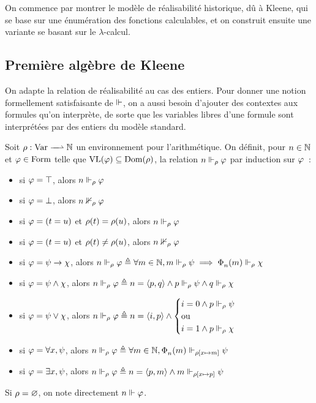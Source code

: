 On commence par montrer le modèle de réalisabilité historique, dû à Kleene, qui
se base sur une énumération des fonctions calculables, et on construit ensuite
une variante se basant sur le $\lambda$-calcul.

\subsection{Première algèbre de Kleene}

On adapte la relation de réalisabilité au cas des entiers. Pour donner une
notion formellement satisfaisante de $\Vdash$, on a aussi besoin d'ajouter des
contextes aux formules qu'on interprète, de sorte que les variables libres d'une
formule sont interprétées par des entiers du modèle standard.

\begin{definition}
  Soit $\makeFunNamePartial{\env}{\Var}{\bN}$ un environnement pour
  l'arithmétique. On définit, pour $n \in \mathbb N$ et $\varphi \in \operatorname{Form}$ telle
  que $\operatorname{VL}(\varphi)\subseteq \operatorname{Dom}(\rho)$, la relation $n\Vdash_\rho \varphi$
  par induction sur $\varphi$~:
  \begin{itemize}
  \item si $\varphi = \top$, alors $n\Vdash_\rho \varphi$
  \item si $\varphi = \bot$, alors $n\nVdash_\rho \varphi$
  \item si $\varphi = (t = u)$ et $\rho(t) = \rho(u)$, alors
    $n\Vdash_\rho \varphi$
  \item si $\varphi = (t = u)$ et $\rho(t) \neq \rho(u)$, alors
    $n\nVdash_\rho \varphi$
  \item si $\varphi = \psi \to \chi$, alors
    $n\Vdash_\rho\varphi\triangleq \forall m \in \mathbb N, m\Vdash_\rho\psi \implies
    \operatorname{\Phi}_{n}^{}(m) \Vdash_\rho\chi$
  \item si $\varphi = \psi \land \chi$, alors
    $n\Vdash_\rho\varphi\triangleq n = \langle p,q\rangle
    \land p \Vdash_\rho\psi\land q\Vdash_\rho\chi$
  \item si $\varphi = \psi \lor \chi$, alors
    $n\Vdash_\rho\varphi \triangleq n = \langle i,p\rangle \land
    \begin{cases}
      i = 0 \land p \Vdash_\rho \psi \\
      \text{ou}\\
      i = 1 \land p \Vdash_\rho \chi
    \end{cases}$
  \item si $\varphi = \forall x, \psi$, alors
    $n\Vdash_\rho\varphi\triangleq\forall m \in \mathbb N,
    \operatorname{\Phi}_{n}^{}(m) \Vdash_{\rho[x \mapsto m]}\psi$
  \item si $\varphi = \exists x, \psi$, alors
    $n\Vdash_\rho\varphi \triangleq n = \langle p,m\rangle \land
    m\Vdash_{\rho[x\mapsto p]} \psi$
  \end{itemize}
  Si $\rho = \varnothing$, on note directement $n\Vdash \varphi$.
  \index[notation]{$\real_{\env}$}
\end{definition}

